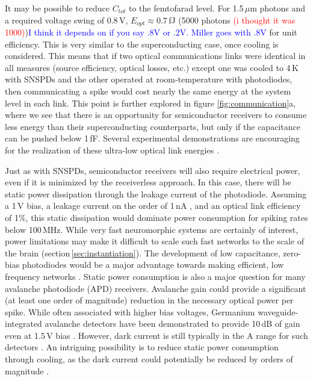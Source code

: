 \documentclass[twocolumn]{article}
\begin{document}
It may be possible to reduce $C_{tot}$ to the femtofarad level. For 1.5\,$\mu$m photons and a required voltage swing of 0.8\,V, $E_{opt} \approx 0.7 $\,fJ (5000 photons \textcolor{red}{(i thought it was 1000)})\textcolor{blue}{I think it depends on if you say .8V or .2V. Miller goes with .8V} for unit efficiency. This is very similar to the superconducting case, once cooling is considered. This means that if two optical communications links were identical in all measures (source efficiency, optical losses, etc.) except one was cooled to 4\,K with SNSPDs and the other operated at room-temperature with photodiodes, then communicating a spike would cost nearly the same energy at the system level in each link. This point is further explored in figure \ref{fig:communication}a, where we see that there is an opportunity for semiconductor receivers to consume less energy than their superconducting counterparts, but only if the capacitance can be pushed below 1\,fF. Several experimental demonstrations are encouraging for the realization of these ultra-low optical link energies \cite{derose2011ultra, tossoun2019ultra, nozaki2016photonic}.

Just as with SNSPDs, semiconductor receivers will also require electrical power, even if it is minimized by the receiverless approach. In this case, there will be static power dissipation through the leakage current of the photodiode. Assuming a 1\,V bias, a leakage current on the order of 1\,nA \cite{zhang2020scalable}, and an optical link efficiency of 1\%, this static dissipation would dominate power consumption for spiking rates below 100\,MHz. While very fast neuromorphic systems are certainly of interest, power limitations may make it difficult to scale such fast networks to the scale of the brain (section\,\ref{sec:instantiation}). The development of low capacitance, zero-bias photodiodes would be a major advantage towards making efficient, low frequency networks \cite{nozaki2018forward}. Static power consumption is also a major question for many avalanche photodiode (APD) receivers. Avalanche gain could provide a significant (at least one order of magnitude) reduction in the necessary optical power \cite{miller2017attojoule} per spike. While often associated with higher bias voltages, Germanium waveguide-integrated avalanche detectors have been demonstrated to provide 10\,dB of gain even at 1.5\,V bias \cite{assefa2010reinventing}. However, dark current is still typically in the \textmu A range for such detectors \cite{assefa2010reinventing, virot2014germanium}. An intriguing possibility is to reduce static power consumption through cooling, as the dark current could potentially be reduced by orders of magnitude \cite{pizzone2020analysis}.  
\end{document}
